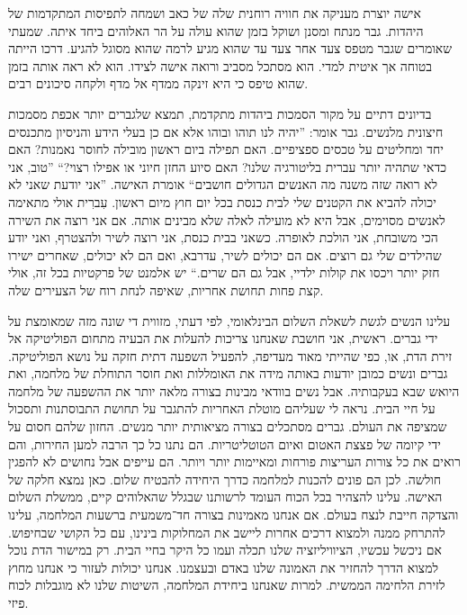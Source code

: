 \documentclass[12pt, extrafontsizes, twopage, a5paper]{memoir}
\begin{document}
אישה יוצרת מעניקה את חוויה רוחנית שלה של
כאב ושמחה לתפיסות המתקדמות של היהדות. 
גבר מנתח ומסנן ושוקל בזמן שהוא
עולה על הר האלוהים ביחד איתה. שמעתי שאומרים שגבר
מטפס צעד אחר צעד עד שהוא מגיע לרמה שהוא מסוגל
להגיע. דרכו הייתה בטוחה אך איטית למדי. הוא מסתכל
מסביב ורואה אישה לצידו. הוא לא ראה אותה
בזמן שהוא טיפס כי היא זינקה ממדף אל
מדף ולקחה סיכונים רבים.

בדיונים דתיים על מקור הסמכות
ביהדות מתקדמת, תמצא שלגברים יותר אכפת
מסמכות חיצונית מלנשים. גבר אומר: ”יהיה לנו
תוהו ובוהו אלא אם כן בעלי הידע והניסיון מתכנסים
יחד ומחליטים על טכסים ספציפיים. האם תפילה ביום ראשון
מובילה לחוסר נאמנות? האם כדאי שתהיה יותר עברית
בליטורגיה שלנו? האם סיוע החזן חיוני או
אפילו רצוי?“ ”טוב, אני לא רואה שזה משנה מה
האנשים הגדולים חושבים“ אומרת האישה. ”אני יודעת שאני לא יכולה להביא
את הקטנים שלי לבית כנסת בכל יום חוץ מיום ראשון. עִברִית
אולי מתאימה לאנשים מסוימים, אבל היא לא מועילה
לאלה שלא מבינים אותה. אם אני רוצה את השירה הכי משובחת,
אני הולכת לאופרה. כשאני בבית כנסת, אני רוצה
לשיר ולהצטרף, ואני יודע שהילדים שלי גם רוצים. אם הם
יכולים לשיר, עדרבא, ואם הם לא יכולים, שאחרים
ישירו חזק יותר ויכסו את קולות ילדיי, אבל גם הם
שרים.“ יש אלמנט של פרקטיות בכל
זה, אולי קצת פחות תחושת אחריות, שאיפה
לנחת רוח של הצעירים שלה.

עלינו הנשים לגשת לשאלת השלום הבינלאומי,
לפי דעתי, מזווית די שונה מזה
שמאומצת על ידי גברים. ראשית, אני חושבת שאנחנו צריכות להעלות
את הבעיה מתחום הפוליטיקה אל זירת
הדת, או, כפי שהייתי מאוד מעדיפה, להפעיל
השפעה דתית חזקה על נושא הפוליטיקה. גברים
ונשים כמובן יודעות באותה מידה את האומללות ואת
חוסר התוחלת של מלחמה, ואת היואש שבא בעקבותיה.
אבל נשים בוודאי מבינות בצורה מלאה יותר את ההשפעה
של מלחמה על חיי הבית. נראה לי שעליהם מוטלת האחריות
להתגבר על תחושת התבוסתנות ותסכול
שמציפה את העולם. גברים מסתכלים בצורה
מציאותית יותר מנשים. החזון שלהם
חסום על ידי קיומה של פצצת האטום ואיום
הטוטליטריות. הם נתנו כל כך הרבה למען
החירות, והם רואים את כל צורות העריצות פורחות
ומאיימות יותר ויותר. הם עייפים אבל
נחושים לא להפגין חולשה. לכן הם פונים להכנות למלחמה
כדרך היחידה להבטיח שלום. כאן נמצא
חלקה של האישה. עלינו להצהיר בכל הכוח
העומד לרשותנו שבגלל שהאלוהים קיים, ממשלת השלום
והצדקה חייבת לנצח בעולם. אם אנחנו מאמינות בצורה חד־משמעית
ברשעות המלחמה, עלינו להתרחק ממנה
ולמצוא דרכים אחרות ליישב את המחלוקות בינינו,
עם כל הקושי שבחיפוש. אם ניכשל עכשיו, הציוויליזציה שלנו
תכלה ועמו כל היקר בחיי הבית.
רק במישור הדת נוכל למצוא
הדרך להחזיר את האמונה שלנו באדם ובעצמנו. אנחנו
יכולות לעזור כי אנחנו מחוץ לזירת הלחימה הממשית.
למרות שאנחנו ביחידת המלחמה, השיטות שלנו לא
מוגבלות לכוח פיזי.
\end{document}

